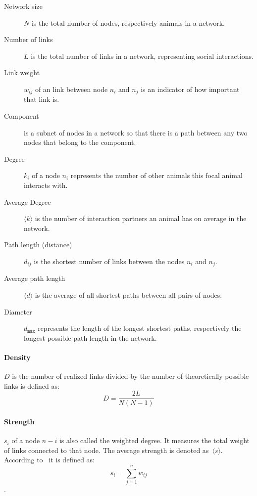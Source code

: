 \colorbox{usethiscolorhere}{
\begin{minipage}[!b]{\dimexpr\textwidth}%
\parbox{0.95\textwidth}{
\small
\begin{addmargin}[1em]{0em}
\vspace{5mm}
\begin{description}
	\item[Network size] $N$ is the total number of nodes, respectively animals in a network.
	\item[Number of links] $L$ is the total number of links in a network, representing social interactions.
	\item[Link weight] $w_{ij}$ of an link between node $n_i$ and $n_j$ is an indicator of how important that link is.
	\item[Component] is a subnet of nodes in a network so that there is a path between any two nodes that belong to the component.
	\item[Degree] $k_i$ of a node $n_i$ represents the number of other animals this focal animal interacts with.
	\item[Average Degree] $\langle k \rangle$ is the number of interaction partners an animal has on average in the network.
	\item[Path length (distance)] $d_{ij}$ is the shortest number of links between the nodes $n_i$ and $n_j$.
	\item[Average path length] $\langle d \rangle$ is the average of all shortest paths between all pairs of nodes.
	\item[Diameter] $d_{\texttt{max}}$ represents the length of the longest shortest paths, respectively the longest possible path length in the network.
\end{description}
\vspace{5mm}
\end{addmargin}
}
\end{minipage}}


\paragraph{Density} $D$ is the number of realized links divided by the number
of theoretically possible links is defined as: $$D=\frac{2L}{N(N-1)}$$

\paragraph{Strength} $s_i$ of a node $n-i$ is also called the weighted degree.
It measures the total weight of links connected to that node.
The average strength is denoted as~$\langle s \rangle$.
According to~\textcite{barrat2004architecture} it is defined as:
$$s_i = \sum_{j=1}^{n}w_{ij}$$. 


